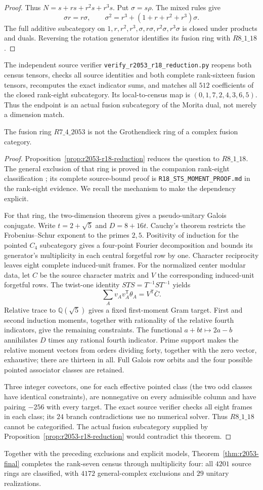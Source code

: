 \begin{proof}
Thus $N=s+rs+r^2s+r^3s$. Put $\sigma=s\rho$. The mixed rules give
\[
 \sigma r=r\sigma,\qquad
 \sigma^2=r^3+(1+r+r^2+r^3)\sigma.
\]
The full additive subcategory on
$1,r,r^2,r^3,\sigma,r\sigma,r^2\sigma,r^3\sigma$ is closed under
products and duals. Reversing the rotation generator identifies its
fusion ring with $R8\_1\_18$.
\end{proof}

The independent source verifier
\texttt{verify\_r2053\_r18\_reduction.py} reopens both census tensors,
checks all source identities and both complete rank-sixteen fusion
tensors, recomputes the exact indicator sums, and matches all $512$
coefficients of the closed rank-eight subcategory. Its local-to-census
map is $(0,1,7,2,4,3,6,5)$. Thus the endpoint is an actual fusion
subcategory of the Morita dual, not merely a dimension match.


\begin{theorem}\label{thm:r2053-final}
The fusion ring $R7\_4\_2053$ is not the Grothendieck ring of a
complex fusion category.
\end{theorem}
\begin{proof}
Proposition~\ref{prop:r2053-r18-reduction} reduces the question to
$R8\_1\_18$. The general exclusion of that ring is proved in the
companion rank-eight classification \cite{Rank8}; its complete
source-bound proof is
\texttt{R18\_STS\_MOMENT\_PROOF.md} in the rank-eight evidence.
We recall the mechanism to make the dependency explicit.

For that ring, the two-dimension theorem gives a pseudo-unitary
Galois conjugate. Write $t=2+\sqrt5$ and $D=8+16t$.
Cauchy's theorem restricts the Frobenius--Schur exponent to the
primes $2,5$. Positivity of induction for the pointed $C_4$
subcategory gives a four-point Fourier decomposition and bounds
its generator's multiplicity in each central forgetful row by one.
Character reciprocity leaves eight complete induced-unit frames.
For the normalized center modular data, let $C$ be the source
character matrix and $V$ the corresponding induced-unit forgetful
rows. The twist-one identity $STS=T^{-1}ST^{-1}$ yields
\[
 \sum_A v_Av_A^{\mathsf T}\theta_A
       =V^{\mathsf T}\overline C.
\]
Relative trace to $\mathbb Q(\sqrt5)$ gives a fixed first-moment
Gram target. First and second induction moments, together with
rationality of the relative fourth indicators, give the remaining
constraints. The functional $a+bt\mapsto2a-b$ annihilates $D$
times any rational fourth indicator. Prime support makes the
relative moment vectors from orders dividing forty, together with
the zero vector, exhaustive; there are thirteen in all. Full Galois row
orbits and the four possible pointed associator classes are retained.

Three integer covectors, one for each effective pointed class
(the two odd classes have identical constraints), are nonnegative
on every admissible column and have pairing $-256$ with every target.
The exact source verifier checks all eight frames in each class;
its $24$ branch contradictions use no numerical solver.
Thus $R8\_1\_18$ cannot be categorified. The actual fusion
subcategory supplied by Proposition~\ref{prop:r2053-r18-reduction}
would contradict this theorem.
\end{proof}

Together with the preceding exclusions and explicit models,
Theorem~\ref{thm:r2053-final} completes the rank-seven census through
multiplicity four: all $4201$ source rings are classified, with
$4172$ general-complex exclusions and $29$ unitary realizations.
